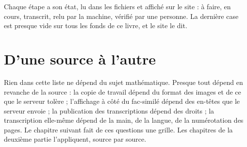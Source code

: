 Chaque étape a son état, lu dans les fichiers et affiché sur le site : à faire, en cours,
transcrit, relu par la machine, vérifié par une personne. La dernière case est presque vide
sur tous les fonds de ce livre, et le site le dit.

\section{D'une source à l'autre}

Rien dans cette liste ne dépend du sujet mathématique. Presque tout dépend en revanche de
la source : la copie de travail dépend du format des images et de ce que le serveur
tolère ; l'affichage à côté du fac-similé dépend des en-têtes que le serveur envoie ; la
publication des transcriptions dépend des droits ; la transcription elle-même dépend de la
main, de la langue, de la numérotation des pages. Le chapitre suivant fait de ces questions
une grille. Les chapitres de la deuxième partie l'appliquent, source par source.
